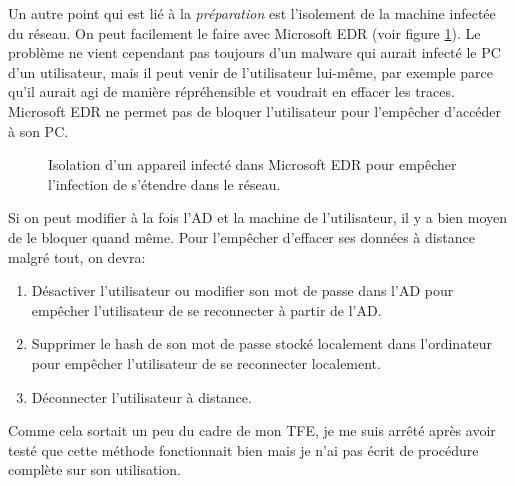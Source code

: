 Un autre point qui est lié à la \textit{préparation} est l'isolement de la machine infectée du réseau. On peut facilement le faire avec Microsoft EDR (voir figure \ref{fig:microsoft-edr-isolate}). Le problème ne vient cependant pas toujours d'un malware qui aurait infecté le PC d'un utilisateur, mais il peut venir de l'utilisateur lui-même, par exemple parce qu'il aurait agi de manière répréhensible et voudrait en effacer les traces. Microsoft EDR ne permet pas de bloquer l'utilisateur pour l'empêcher d'accéder à son PC. 

\begin{figure}
    \centering
    \caption{Isolation d'un appareil infecté dans Microsoft EDR pour empêcher l'infection de s'étendre dans le réseau.}
    \label{fig:microsoft-edr-isolate}
\end{figure}

Si on peut modifier à la fois l'AD et la machine de l'utilisateur, il y a bien moyen de le bloquer quand même. Pour l'empêcher d'effacer ses données à distance malgré tout, on devra:

\begin{enumerate}
    \item Désactiver l'utilisateur ou modifier son mot de passe dans l'AD pour empêcher l'utilisateur de se reconnecter à partir de l'AD.
    \item Supprimer le hash de son mot de passe stocké localement dans l'ordinateur pour empêcher l'utilisateur de se reconnecter localement.
    \item Déconnecter l'utilisateur à distance.
\end{enumerate}

Comme cela sortait un peu du cadre de mon TFE, je me suis arrêté après avoir testé que cette méthode fonctionnait bien mais je n'ai pas écrit de procédure complète sur son utilisation.

